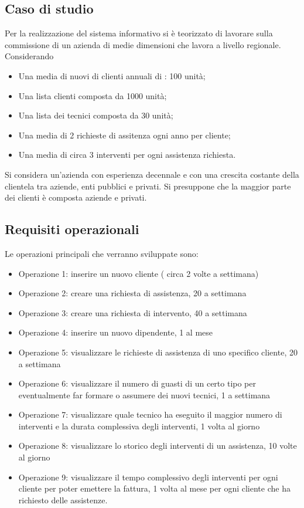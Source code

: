 \documentclass[legalpaper]{article}
\begin{document}
\subsection{Caso di studio}
Per la realizzazione del sistema informativo si è teorizzato di lavorare sulla commissione di un azienda di medie dimensioni che lavora a livello regionale. \\ Considerando
\begin{itemize}
    \item Una media di nuovi di clienti annuali di : 100 unità;
    \item Una lista clienti composta da 1000 unità;
    \item Una lista dei tecnici composta da 30 unità;
    \item Una media di 2 richieste di assitenza ogni anno per cliente;
    \item Una media di circa 3 interventi per ogni assistenza richiesta.
\end{itemize}
Si considera un'azienda con esperienza decennale e con una crescita costante della clientela tra aziende, enti pubblici e privati.  Si presuppone che la maggior parte dei clienti è composta aziende e privati.

\subsection{Requisiti operazionali}
Le operazioni principali che verranno sviluppate sono:
\begin{itemize}
    \item Operazione 1: inserire un nuovo cliente ( circa 2 volte a settimana)
    \item Operazione 2: creare una richiesta di assistenza, 20 a settimana
    \item Operazione 3: creare una richiesta di intervento, 40 a settimana
    \item Operazione 4: inserire un nuovo dipendente, 1 al mese
    \item Operazione 5: visualizzare le richieste di assistenza di uno specifico cliente, 20 a settimana
    \item Operazione 6: visualizzare il numero di guasti di un certo tipo per eventualmente far formare o assumere dei nuovi tecnici, 1 a settimana
    \item Operazione 7: visualizzare quale tecnico ha eseguito il maggior numero di interventi e la durata complessiva degli interventi, 1 volta al giorno
    \item Operazione 8: visualizzare lo storico degli interventi di un assistenza, 10 volte al giorno
    \item Operazione 9: visualizzare il tempo complessivo degli interventi per ogni cliente per poter emettere la fattura, 1 volta al mese per ogni cliente che ha richiesto delle assistenze.
\end{itemize}
\end{document}
